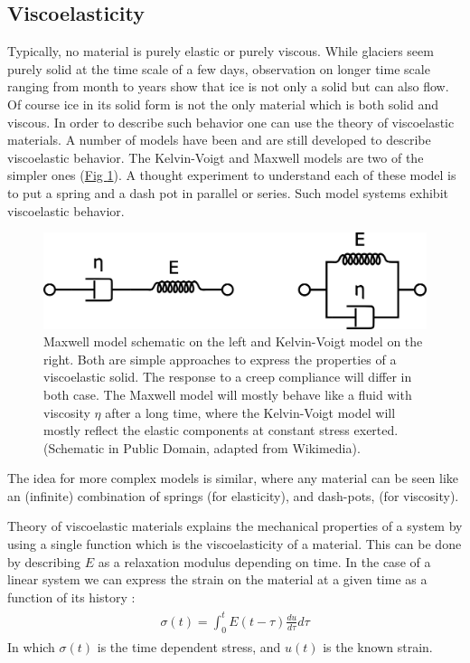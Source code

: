 \documentclass[A4paperpaper,11pt,english]{sphinxmanual}
\begin{document}
\subsection{Viscoelasticity}
\label{index-latex:viscoelasticity}
Typically, no material is purely elastic or purely viscous. While glaciers
seem purely solid at the time scale of a few days, observation on longer time
scale ranging from month to years show that ice is not only a
solid but can also flow. Of course ice in its solid form is not the only
material which is both solid and viscous. In order to describe such
behavior one can use the theory of viscoelastic materials.  A number of models have
been and are still developed to describe viscoelastic behavior. The
Kelvin-Voigt and Maxwell models are two of the simpler ones (\hyperref[index-latex:fig-mkv]{Fig  \ref*{index-latex:fig-mkv}}). A thought
experiment to understand each of these model is to put a spring and a dash pot
in parallel or series. Such model systems exhibit viscoelastic behavior.
\begin{figure}[htbp]
\centering
\capstart

\includegraphics[width=0.700\linewidth]{MKV.png}
\caption{Maxwell model schematic on the left and Kelvin-Voigt model on the right.
Both are simple approaches to express the properties of a viscoelastic
solid. The response to a creep compliance will differ in both case. The Maxwell
model will mostly behave like a fluid with viscosity \(\eta\) after a
long time, where the Kelvin-Voigt model will mostly reflect the elastic
components at constant stress exerted. (Schematic in Public Domain, adapted
from Wikimedia).}\label{index-latex:fig-mkv}\end{figure}

The idea for more complex models is similar, where any material can be seen like an
(infinite) combination of springs (for elasticity), and dash-pots, (for viscosity).

Theory of viscoelastic materials explains the mechanical properties of a system by
using a single function which is the viscoelasticity of a material. This can
be done by describing \(E\) as a relaxation modulus depending on time.  In
the case of a linear system we can express the strain on the material at a given
time as a function of its history :
\label{index-latex:equation-strain}\begin{gather}
\begin{split}\sigma (t)  = \int_0^t E(t-\tau) \frac{du}{d\tau} d\tau\end{split}\label{index-latex-strain}
\end{gather}
In which \(\sigma(t)\) is the time dependent stress, and \(u(t)\) is
the known strain.
\end{document}
